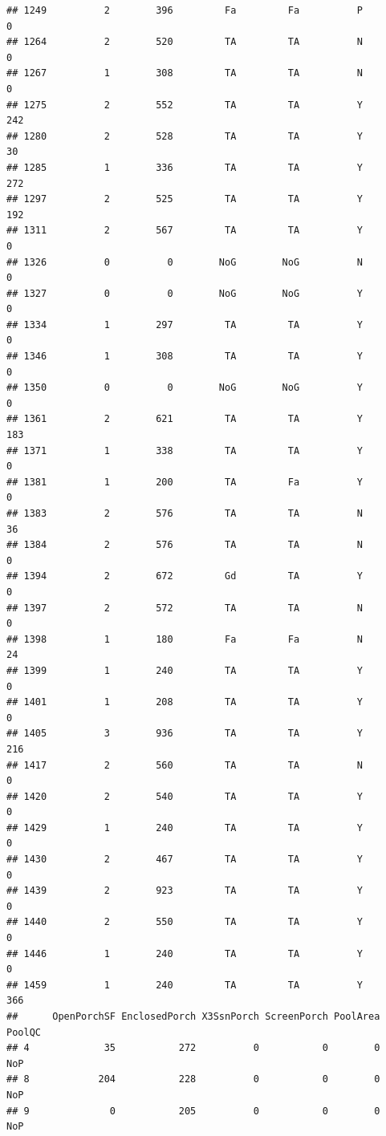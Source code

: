 \documentclass[]{article}
\begin{document}
\begin{verbatim}
## 1249          2        396         Fa         Fa          P          0
## 1264          2        520         TA         TA          N          0
## 1267          1        308         TA         TA          N          0
## 1275          2        552         TA         TA          Y        242
## 1280          2        528         TA         TA          Y         30
## 1285          1        336         TA         TA          Y        272
## 1297          2        525         TA         TA          Y        192
## 1311          2        567         TA         TA          Y          0
## 1326          0          0        NoG        NoG          N          0
## 1327          0          0        NoG        NoG          Y          0
## 1334          1        297         TA         TA          Y          0
## 1346          1        308         TA         TA          Y          0
## 1350          0          0        NoG        NoG          Y          0
## 1361          2        621         TA         TA          Y        183
## 1371          1        338         TA         TA          Y          0
## 1381          1        200         TA         Fa          Y          0
## 1383          2        576         TA         TA          N         36
## 1384          2        576         TA         TA          N          0
## 1394          2        672         Gd         TA          Y          0
## 1397          2        572         TA         TA          N          0
## 1398          1        180         Fa         Fa          N         24
## 1399          1        240         TA         TA          Y          0
## 1401          1        208         TA         TA          Y          0
## 1405          3        936         TA         TA          Y        216
## 1417          2        560         TA         TA          N          0
## 1420          2        540         TA         TA          Y          0
## 1429          1        240         TA         TA          Y          0
## 1430          2        467         TA         TA          Y          0
## 1439          2        923         TA         TA          Y          0
## 1440          2        550         TA         TA          Y          0
## 1446          1        240         TA         TA          Y          0
## 1459          1        240         TA         TA          Y        366
##      OpenPorchSF EnclosedPorch X3SsnPorch ScreenPorch PoolArea PoolQC
## 4             35           272          0           0        0    NoP
## 8            204           228          0           0        0    NoP
## 9              0           205          0           0        0    NoP

\end{verbatim}
\end{document}
